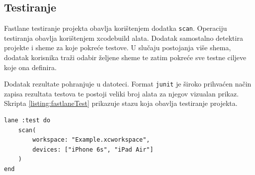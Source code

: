 \documentclass[times, utf8, diplomski, numeric]{fer}
\begin{document}
\begin{appendices}
\section{Testiranje}

Fastlane testiranje projekta obavlja korištenjem dodatka \verb|scan|\citep{fastlane:scan}. Operaciju testiranja obavlja korištenjem xcodebuild alata. Dodatak samostalno detektira projekte i sheme za koje pokreće testove. U slučaju postojanja više shema, dodatak korisnika traži odabir željene sheme te zatim pokreće sve testne ciljeve koje ona definira.

Dodatak rezultate pohranjuje u  datoteci. Format \verb|junit| je široko prihvaćen način zapisa rezultata testova te postoji veliki broj alata za njegov vizualan prikaz. Skripta \ref{listing:fastlaneTest} prikazuje stazu koja obavlja testiranje projekta.

\begin{lstlisting}[caption=Testiranje projekta korištenjem scan dodatka, label=listing:fastlaneTest]
lane :test do
    scan(
        workspace: "Example.xcworkspace",
        devices: ["iPhone 6s", "iPad Air"]
    )
end
\end{lstlisting}


\end{appendices}
\end{document}
